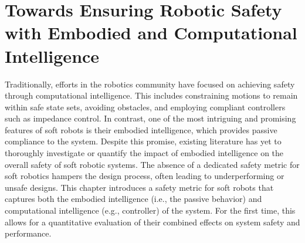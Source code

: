 \chapter{Towards Ensuring Robotic Safety with Embodied and Computational Intelligence}
\label{chp:safetymetric}

\begin{foreword}
    Traditionally, efforts in the robotics community have focused on achieving safety through computational intelligence. This includes constraining motions to remain within safe state sets, avoiding obstacles, and employing compliant controllers such as impedance control. In contrast, one of the most intriguing and promising features of soft robots is their embodied intelligence, which provides passive compliance to the system. Despite this promise, existing literature has yet to thoroughly investigate or quantify the impact of embodied intelligence on the overall safety of soft robotic systems. The absence of a dedicated safety metric for soft robotics hampers the design process, often leading to underperforming or unsafe designs. This chapter introduces a safety metric for soft robots that captures both the embodied intelligence (i.e., the passive behavior) and computational intelligence (e.g., controller) of the system. For the first time, this allows for a quantitative evaluation of their combined effects on system safety and performance.
\end{foreword}


